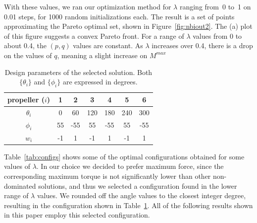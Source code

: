 With these values, we ran our optimization method for $\lambda$
ranging from~0 to~1 on 0.01 steps, for 1000 random initializations
each. The result is a set of points approximating the Pareto optimal
set, shown in Figure~\ref{fig:nbiout2}. The (a) plot of this figure
suggests a convex Pareto front. For a range of $\lambda$ values from 0
to about 0.4, the $(p,q)$ values are constant. As $\lambda$ increases
over 0.4, there is a drop on the values of $q$, meaning a slight
increase on $M^{max}$


\begin{table}
  \centering
  \begin{tabular}{ccccccc}
    propeller ($i$) & 1 & 2 & 3 & 4 & 5 & 6 \\
    \hline
    $\theta_i$ & 0 & 60 & 120 & 180 & 240 & 300 \\
    $\phi_i$ & 55 & -55 & 55 & -55 & 55 & -55 \\
    $w_i$ & -1 & 1 & -1 & 1 & -1 & 1 \\
    \hline
  \end{tabular}
  \caption{Design parameters of the selected solution. Both
    $\{\theta_i\}$ and $\{\phi_i\}$ are expressed in degrees.}
  \label{tab:selected}
\end{table}

Table~\ref{tab:configs} shows some of the optimal configurations
obtained for some values of $\lambda$. In our choice we decided to
prefer maximum force,
since the corresponding maximum torque is not significantly
lower than other non-dominated solutions, and thus we selected a configuration found in
the lower range of $\lambda$ values. We rounded off the angle values
to the closest integer degree, resulting in the configuration shown in
Table~\ref{tab:selected}. All of the following results shown in this
paper employ this selected configuration.






